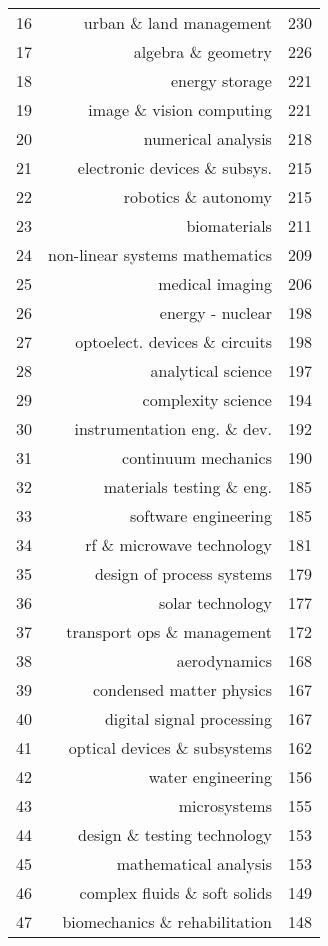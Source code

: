 \begin{spacing}{0.9}
\begin{longtable}[c]{r|r|>{\raggedleft\arraybackslash}m{2.3cm}}
{16} & {urban \& land management} & {230}\\
{17} & {algebra \& geometry} & {226}\\
{18} & {energy storage} & {221}\\
{19} & {image \& vision computing} & {221}\\
{20} & {numerical analysis} & {218}\\
{21} & {electronic devices \& subsys.} & {215}\\
{22} & {robotics \& autonomy} & {215}\\
{23} & {biomaterials} & {211}\\
{24} & {non-linear systems mathematics} & {209}\\
{25} & {medical imaging} & {206}\\
{26} & {energy - nuclear} & {198}\\
{27} & {optoelect. devices \& circuits} & {198}\\
{28} & {analytical science} & {197}\\
{29} & {complexity science} & {194}\\
{30} & {instrumentation eng. \& dev.} & {192}\\
{31} & {continuum mechanics} & {190}\\
{32} & {materials testing \& eng.} & {185}\\
{33} & {software engineering} & {185}\\
{34} & {rf \& microwave technology} & {181}\\
{35} & {design of process systems} & {179}\\
{36} & {solar technology} & {177}\\
{37} & {transport ops \& management} & {172}\\
{38} & {aerodynamics} & {168}\\
{39} & {condensed matter physics} & {167}\\
{40} & {digital signal processing} & {167}\\
{41} & {optical devices \& subsystems} & {162}\\
{42} & {water engineering} & {156}\\
{43} & {microsystems} & {155}\\
{44} & {design \& testing technology} & {153}\\
{45} & {mathematical analysis} & {153}\\
{46} & {complex fluids \& soft solids} & {149}\\
{47} & {biomechanics \& rehabilitation} & {148}\\

\end{longtable}
\end{spacing}
